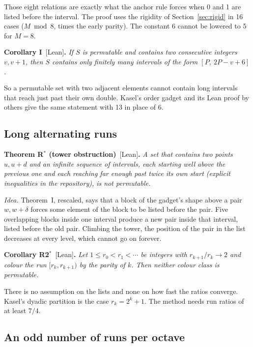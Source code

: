 \documentclass[11pt,letterpaper]{article}
\newcommand{\st}[1]{\textnormal{\textsf{\small[#1]}}}
\newenvironment{result}[2]%
  {\par\medskip\noindent\textbf{#1}\ \st{#2}\textbf{.}\enspace\itshape}%
  {\par\medskip}
\newcommand{\idea}[1]{\par\smallskip\noindent\textit{#1.}\enspace}
\begin{document}
Those eight relations are exactly what the anchor rule forces when 0 and 1 are listed before the interval.
The proof uses the rigidity of Section~\ref{sec:rigid} in 16 cases ($M \bmod 8$, times the early parity).
The constant 6 cannot be lowered to 5 for $M = 8$.

\begin{result}{Corollary I}{Lean}
If $S$ is permutable and contains two consecutive integers $v, v+1$, then $S$ contains only finitely many
intervals of the form $[P,\ 2P-v+6]$.
\end{result}

So a permutable set with two adjacent elements cannot contain long intervals that reach just past their own
double. Kasel's order gadget and its Lean proof by others \cite{tru} give the same statement with 13 in
place of 6.

\subsection{Long alternating runs}

\begin{result}{Theorem R$^*$ (tower obstruction)}{Lean}
A set that contains two points $u, u+d$ and an infinite sequence of intervals, each starting well above the
previous one and each reaching far enough past twice its own start (explicit inequalities in the
repository), is not permutable.
\end{result}

\idea{Idea} Theorem~I, rescaled, says that a block of the gadget's shape above a pair $w, w+\delta$ forces
some element of the block to be listed before the pair. Five overlapping blocks inside one interval produce
a new pair inside that interval, listed before the old pair. Climbing the tower, the position of the pair in
the list decreases at every level, which cannot go on forever.

\begin{result}{Corollary R2$^*$}{Lean}
Let $1 \le r_0 < r_1 < \cdots$ be integers with $r_{k+1}/r_k \to 2$ and colour the run $[r_k, r_{k+1})$ by
the parity of $k$. Then neither colour class is permutable.
\end{result}

There is no assumption on the lists and none on how fast the ratios converge. Kasel's dyadic partition is
the case $r_k = 2^k+1$. The method needs run ratios of at least $7/4$.

\subsection{An odd number of runs per octave}\label{sec:rho}
\end{document}
